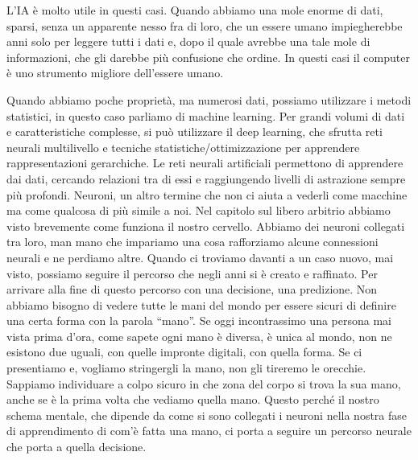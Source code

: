 \documentclass[12pt]{book} %
\begin{document}
L'IA è molto utile in questi casi. Quando abbiamo una mole enorme di dati, sparsi, senza un
apparente nesso fra di loro, che un essere umano impiegherebbe anni solo per leggere tutti i dati e, dopo il quale
avrebbe una tale mole di informazioni, che gli darebbe più confusione che ordine. In questi casi il computer è uno
strumento migliore dell'essere umano.

Quando abbiamo poche proprietà, ma numerosi dati, possiamo utilizzare i metodi statistici, in questo caso parliamo di
machine learning. Per grandi volumi di dati e caratteristiche complesse, si può utilizzare il deep learning, che sfrutta reti neurali multilivello e tecniche statistiche/ottimizzazione per apprendere rappresentazioni gerarchiche. Le reti neurali artificiali permettono di apprendere
dai dati, cercando relazioni tra di essi e raggiungendo livelli di astrazione sempre più profondi. Neuroni, un altro
termine che non ci aiuta a vederli come macchine ma come qualcosa di più simile a noi. Nel capitolo sul libero arbitrio
abbiamo visto brevemente come funziona il nostro cervello. Abbiamo dei neuroni collegati tra loro, man mano che
impariamo una cosa rafforziamo alcune connessioni neurali e ne perdiamo altre. Quando ci troviamo davanti a un caso
nuovo, mai visto, possiamo seguire il percorso che negli anni si è creato e raffinato. Per arrivare alla fine di questo
percorso con una decisione, una predizione. Non abbiamo bisogno di vedere tutte le mani del mondo per essere sicuri di
definire una certa forma con la parola “mano”. Se oggi incontrassimo una persona mai vista prima
d'ora, come sapete ogni mano è diversa, è unica al mondo, non ne esistono due uguali, con quelle
impronte digitali, con quella forma. Se ci presentiamo e, vogliamo stringergli la mano, non gli tireremo le orecchie.
Sappiamo individuare a colpo sicuro in che zona del corpo si trova la sua mano, anche se è la prima volta che vediamo
quella mano. Questo perché il nostro schema mentale, che dipende da come si sono collegati i neuroni nella nostra fase
di apprendimento di com'è fatta una mano, ci porta a seguire un percorso neurale che porta a
quella decisione.
\end{document}
